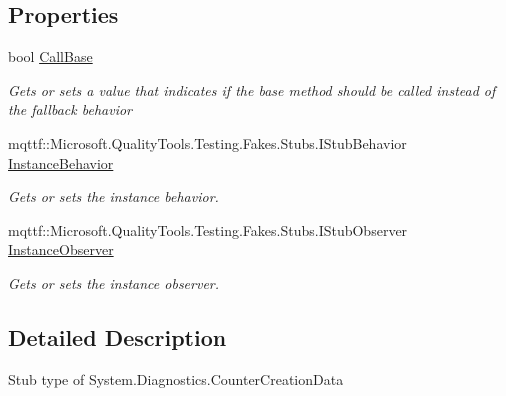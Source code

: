 \subsection*{Properties}
\begin{DoxyCompactItemize}
\item 
bool \hyperlink{class_system_1_1_diagnostics_1_1_fakes_1_1_stub_counter_creation_data_a24df646b543562717fc69981645f8bed}{Call\-Base}
\begin{DoxyCompactList}\small\item\em Gets or sets a value that indicates if the base method should be called instead of the fallback behavior\end{DoxyCompactList}\item 
mqttf\-::\-Microsoft.\-Quality\-Tools.\-Testing.\-Fakes.\-Stubs.\-I\-Stub\-Behavior \hyperlink{class_system_1_1_diagnostics_1_1_fakes_1_1_stub_counter_creation_data_a2ae19c2896861a9368a53b0fdc99e121}{Instance\-Behavior}
\begin{DoxyCompactList}\small\item\em Gets or sets the instance behavior.\end{DoxyCompactList}\item 
mqttf\-::\-Microsoft.\-Quality\-Tools.\-Testing.\-Fakes.\-Stubs.\-I\-Stub\-Observer \hyperlink{class_system_1_1_diagnostics_1_1_fakes_1_1_stub_counter_creation_data_a09bbab9032d29f81bffaf1543ae6c836}{Instance\-Observer}
\begin{DoxyCompactList}\small\item\em Gets or sets the instance observer.\end{DoxyCompactList}\end{DoxyCompactItemize}


\subsection{Detailed Description}
Stub type of System.\-Diagnostics.\-Counter\-Creation\-Data



